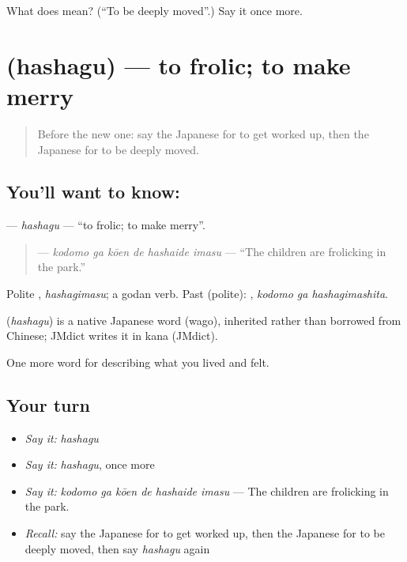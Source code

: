 \begin{tcolorbox}[breakable,colback=teal!4,colframe=teal!35!black,title={Before you move on}]
What does  mean? (\textquotedblleft{}To be deeply moved\textquotedblright{}.) Say it once more.
\end{tcolorbox}
\section[\texorpdfstring{\ja{はしゃぐ} (hashagu)}{はしゃぐ (hashagu)}]{ (hashagu) — to frolic; to make merry}

\label{lesson:JA-C428-hashagu}



\begin{quote}
Before the new one: say the Japanese for to get worked up, then the Japanese for to be deeply moved.
\end{quote}

\subsection*{You'll want to know: }
\textbf{} — \emph{hashagu} — \textquotedblleft{}to frolic; to make merry\textquotedblright{}.

\begin{quote}
\textbf{  } — \emph{kodomo ga kōen de hashaide imasu} — \textquotedblleft{}The children are frolicking in the park.\textquotedblright{}
\end{quote}

Polite \textbf{}, \emph{hashagimasu}; a godan verb. Past (polite): \textbf{ }, \emph{kodomo ga hashagimashita}.

\begin{cousinweb}
\textbf{} (\emph{hashagu}) is a native Japanese word (wago), inherited rather than borrowed from Chinese; JMdict writes it in kana (JMdict).
\end{cousinweb}

\begin{grammarlens}[title={What you've built}]
One more word for describing what you lived and felt.
\end{grammarlens}

\subsection*{Your turn}
\begin{itemize}
\raggedright
  \item \emph{Say it:} \emph{hashagu}
  \item \emph{Say it:} \emph{hashagu}, once more
  \item \emph{Say it:} \emph{kodomo ga kōen de hashaide imasu} — The children are frolicking in the park.
  \item \emph{Recall:} say the Japanese for to get worked up, then the Japanese for to be deeply moved, then say \emph{hashagu} again
\end{itemize}


